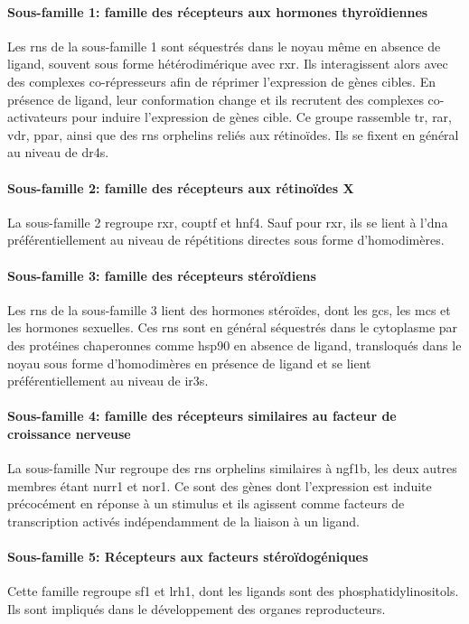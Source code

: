 \documentclass[../main.tex]{subfiles}
\begin{document}
\paragraph{Sous-famille 1: famille des récepteurs aux hormones thyroïdiennes}
Les \glspl{rn} de la sous-famille 1 sont séquestrés dans le noyau même en absence de ligand, souvent sous forme hétérodimérique avec \gls{rxr}.
Ils interagissent alors avec des complexes co-répresseurs afin de réprimer l'expression de gènes cibles.
En présence de ligand, leur conformation change et ils recrutent des complexes co-activateurs pour induire l'expression de gènes cible.
Ce groupe rassemble \gls{tr}, \gls{rar}, \gls{vdr}, \gls{ppar}, ainsi que des \glspl{rn} orphelins reliés aux rétinoïdes. Ils se fixent en général au niveau de \glspl{dr4}.

\paragraph{Sous-famille 2: famille des récepteurs aux rétinoïdes X}
La sous-famille 2 regroupe \gls{rxr}, \gls{couptf} et \gls{hnf4}.
Sauf pour \gls{rxr}, ils se lient à l'\gls{dna} préférentiellement au niveau de répétitions directes sous forme d'homodimères.

\paragraph{Sous-famille 3: famille des récepteurs stéroïdiens}
Les \glspl{rn} de la sous-famille 3 lient des hormones stéroïdes, dont les \glspl{gc}, les \glspl{mc} et les hormones sexuelles. Ces \glspl{rn} sont en général séquestrés dans le cytoplasme par des protéines chaperonnes comme \gls{hsp90} en absence de ligand, transloqués dans le noyau sous forme d'homodimères en présence de ligand et se lient préférentiellement au niveau de \glspl{ir3}.

\paragraph{Sous-famille 4: famille des récepteurs similaires au facteur de croissance nerveuse}
La sous-famille Nur regroupe des \glspl{rn} orphelins similaires à \gls{ngf1b}, les deux autres membres étant \gls{nurr1} et \gls{nor1}.
Ce sont des gènes dont l'expression est induite précocément en réponse à un stimulus et ils agissent comme facteurs de transcription activés indépendamment de la liaison à un ligand.

\paragraph{Sous-famille 5: Récepteurs aux facteurs stéroïdogéniques}
Cette famille regroupe \gls{sf1} et \gls{lrh1}, dont les ligands sont des phosphatidylinositols.
Ils sont impliqués dans le développement des organes reproducteurs.
\end{document}
